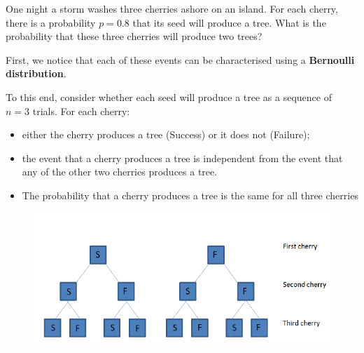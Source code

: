 \documentclass[smaller]{beamer}\usepackage[]{graphicx}\usepackage[]{color}
\begin{document}
\begin{frame}{\secname}


\begin{example} 
\begin{footnotesize}

One night a storm washes three cherries ashore on an island. For each cherry, there is a probability $p=0.8$ that its seed will
produce a tree. What is the probability that these three cherries will produce two
trees?

\bigskip

First, we notice that each of these events can be characterised using a \textbf{Bernoulli distribution}.

To this end, consider whether each seed will produce a tree as a sequence of $n=3$
trials. For each cherry:

\begin{itemize}

\item either the cherry produces a tree (Success) or it does not (Failure);
\item the event that a cherry produces a tree is independent from the event
that any of the other two cherries produces a tree.
\item The probability that a cherry produces a tree is the same for all
three cherries
\end{itemize}
\end{footnotesize}
\end{example}

\end{frame}%


\begin{frame}{\secname}%


\begin{example}[continued]

\begin{figure}[ptb]\centering
\includegraphics[]{img/BINOMIALpic__1.pdf}
\end{figure}

\end{example}
\end{frame}%
\end{document}
